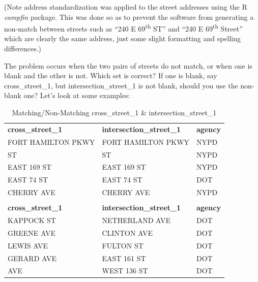 \documentclass[12pt, titlepage]{article}
\begin{document}
(Note address standardization was applied to the street addresses using the R \emph{campfin} package. 
This was done so as to prevent the software from generating a non-match between 
streets such as ``240 E 69\textsuperscript{th} ST'' and ``240 E 69\textsuperscript{th} Street'' 
which are clearly the same address, just some slight formatting and spelling differences.)

The problem occurs when the two pairs of streets do not match, or when one is blank and the
other is not. Which set is correct? If one is blank, say cross\_street\_1, but  intersection\_street\_1
is not blank, should you use the non-blank one?  Let's look at some examples:


\begin{table}[H]
    \centering
    \footnotesize
    \begin{tabular}{>{\small\ttfamily}l >{\small\ttfamily}l >{\small\ttfamily}l}
        \toprule
        \multicolumn{3}{c}{\textbf{Matching cross\_street\_1 and intersection\_street\_1}} \\
        \midrule
        \textbf{cross\_street\_1} & \textbf{intersection\_street\_1} & \textbf{agency} \\
        \midrule
        FORT HAMILTON PKWY & FORT HAMILTON PKWY & NYPD \\
        87 ST              & 87 ST              & NYPD \\
        EAST 169 ST        & EAST 169 ST        & NYPD \\
        EAST 74 ST         & EAST 74 ST         & DOT  \\
        CHERRY AVE         & CHERRY AVE         & NYPD \\
        \midrule
        \multicolumn{3}{c}{\textbf{Non-matching cross\_street\_1 and intersection\_street\_1}} \\
        \midrule
        \textbf{cross\_street\_1} & \textbf{intersection\_street\_1} & \textbf{agency} \\
        \midrule
        KAPPOCK ST     & NETHERLAND AVE   & DOT \\
        GREENE AVE     & CLINTON AVE      & DOT \\
        LEWIS AVE      & FULTON ST        & DOT \\
        GERARD AVE     & EAST 161 ST      & DOT \\
        8 AVE          & WEST 136 ST      & DOT \\
        \bottomrule
    \end{tabular}
    \caption{Matching/Non-Matching cross\_street\_1 \& intersection\_street\_1}
    \label{tab:streets1}
\end{table}
\end{document}
